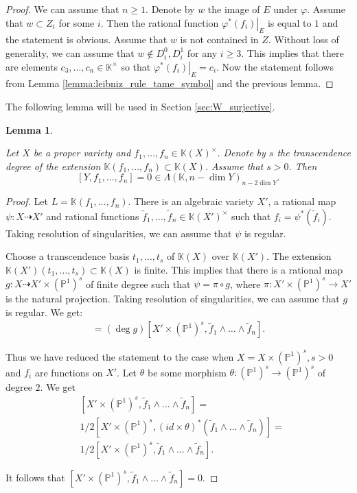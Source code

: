 \documentclass[12pt]{extarticle}
\newtheorem{lemma}[theorem]{Lemma}
\def\mb{\mathbb}
\def\k{\mb K}
\def\ph{\varphi}
\def\ard{\dashrightarrow}
\def\t{\times}
\def\wt{\widetilde}
\renewcommand{\P}{{\mb P}}
\def\wdw{\wedge\dots\wedge}
\newcommand{\res}[2]{\left.{#1}\right|_{#2}}
\begin{document}
\begin{proof}
We can assume that $n\geq 1$. Denote by $w$ the image of $E$ under $\ph$. Assume that $w\subset Z_i$ for some $i$. Then the rational function $\res{\ph^*(f_i)}{E}$ is equal to $1$ and the statement is obvious. Assume that $w$ is not contained in $Z$. Without loss of generality, we can assume that $w\notin D_i^0,D_i^1$ for any $i\geq 3$. This implies that there are elements $c_3,\dots, c_n\in \k^\times$ so that $\res{\varphi^*(f_i)}{E}=c_i$. Now the statement follows from Lemma \ref{lemma:leibniz_rule_tame_symbol} and the previous lemma.
\end{proof}

The following lemma will be used in Section \ref{sec:W_surjective}.


\begin{lemma}
\label{lemma:about_degenerate_cycles}

Let $X$ be a proper variety and $f_1,\dots, f_n\in\k(X)^\times$. Denote by $s$ the transcendence degree of the extension $\k(f_1,\dots, f_n)\subset \k(X)$. Assume that $s>0$. Then
$$[Y, f_1,\dots, f_n]=0\in \Lambda(\k,n-\dim Y)_{n-2\dim Y}.$$
\end{lemma}



\begin{proof}Let $L=\k(f_1,\dots, f_n)$. There is an algebraic variety $X'$, a rational map $\psi\colon X\ard X'$ and rational functions $\wt f_1,\dots, \wt f_n\in\k(X')^\times$ such that $f_i=\psi^*(\wt f_i)$. Taking resolution of singularities, we can assume that $\psi$ is regular.

Choose a transcendence basis $t_1,\dots, t_s$ of $\k(X)$ over $\k(X')$. The extension
    $\k(X')(t_1,\dots, t_s)\subset \k(X)$ is finite. This implies that there is a rational map $g\colon X\ard X'\t(\P^1)^s$ of finite degree such that $\psi=\pi\circ g$, where $\pi\colon X'\t(\P^1)^s\to X'$ is the natural projection. Taking resolution of singularities, we can assume that $g$ is regular. We get:
    \begin{align*}
        [X,f_1\wdw f_n]=(\deg g)[X'\times (\P^1)^s, \wt f_1\wdw \wt f_n].       
    \end{align*}

    Thus we have reduced the statement to the case when $X=X\t(\P^1)^s, s>0$ and $f_i$ are functions on $X'$. Let $\theta$ be some morphism $\theta\colon (\P^1)^s\to (\P^1)^s$ of degree $2$. We get
    \begin{align*}
        &[X'\t (\P^1)^s, \wt f_1\wdw \wt f_n]=\\
        &1/2[X'\t (\P^1)^s,  (id\t\theta)^*(\wt f_1\wdw \wt f_n)]=\\
        &1/2[X'\t (\P^1)^s, \wt f_1\wdw \wt f_n].
    \end{align*}

    It follows that $[X'\t (\P^1)^s, \wt f_1\wdw \wt f_n]=0$.


\end{proof}
\end{document}
